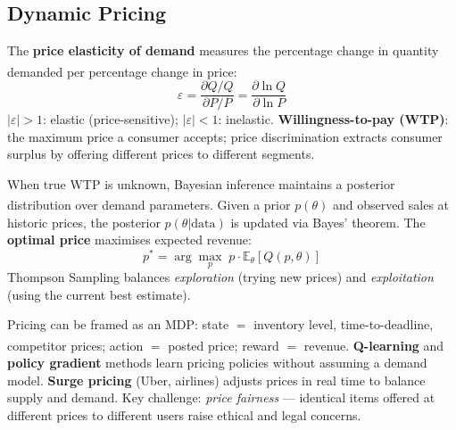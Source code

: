 \subsection{Dynamic Pricing}

\begin{tcbitemize}[ skin=sectionraster ]

    \tcbitem[title=Pricing Theory Foundations, raster multicolumn=3]
    The \textbf{price elasticity of demand} measures the percentage change in quantity demanded per percentage change in price\textsuperscript{\cite[][pp.~39--42]{laudonECommerce2020}}:
    \begin{equation}
        \varepsilon = \frac{\partial Q / Q}{\partial P / P} = \frac{\partial \ln Q}{\partial \ln P}
    \end{equation}
    $|\varepsilon| > 1$: elastic (price-sensitive); $|\varepsilon| < 1$: inelastic.
    \textbf{Willingness-to-pay (WTP)}: the maximum price a consumer accepts; price discrimination extracts consumer surplus by offering different prices to different segments.

    \tcbitem[title={Bayesian Optimal Pricing}, raster multicolumn=3]
    When true WTP is unknown, Bayesian inference maintains a posterior distribution over demand parameters\textsuperscript{\cite[][pp.~45--48]{laudonECommerce2020}}.
    Given a prior $p(\theta)$ and observed sales at historic prices, the posterior $p(\theta | \text{data})$ is updated via Bayes' theorem.
    The \textbf{optimal price} maximises expected revenue:
    \begin{equation}
        p^* = \arg\max_p \; p \cdot \mathbb{E}_\theta[Q(p, \theta)]
    \end{equation}
    Thompson Sampling balances \emph{exploration} (trying new prices) and \emph{exploitation} (using the current best estimate).

    \tcbitem[title=RL-Based Dynamic Pricing, raster multicolumn=3]
    Pricing can be framed as an MDP: state $= $ inventory level, time-to-deadline, competitor prices; action $= $ posted price; reward $= $ revenue\textsuperscript{\cite[][pp.~55--60]{laudonECommerce2020}}.
    \textbf{Q-learning} and \textbf{policy gradient} methods learn pricing policies without assuming a demand model.
    \textbf{Surge pricing} (Uber, airlines) adjusts prices in real time to balance supply and demand.
    Key challenge: \emph{price fairness} --- identical items offered at different prices to different users raise ethical and legal concerns.


\end{tcbitemize}
